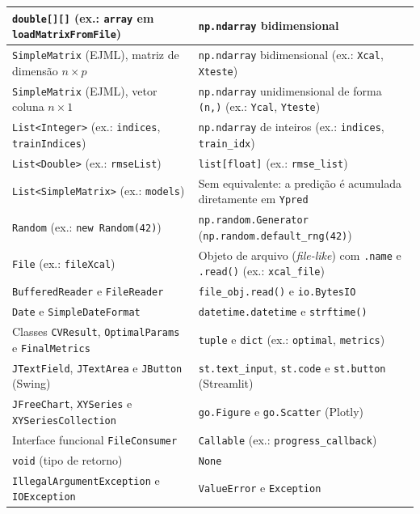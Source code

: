 \begin{quadro}[ht]
\begin{center}
\begin{threeparttable}
\begin{tabularx}{\textwidth}{|>{\raggedright\arraybackslash}X|>{\raggedright\arraybackslash}X|}
\texttt{double[][]} (ex.: \texttt{array} em \texttt{loadMatrixFromFile}) & \texttt{np.ndarray} bidimensional \\ \hline
\texttt{SimpleMatrix} (EJML), matriz de dimensão $n \times p$ & \texttt{np.ndarray} bidimensional (ex.: \texttt{Xcal}, \texttt{Xteste}) \\ \hline
\texttt{SimpleMatrix} (EJML), vetor coluna $n \times 1$ & \texttt{np.ndarray} unidimensional de forma \texttt{(n,)} (ex.: \texttt{Ycal}, \texttt{Yteste}) \\ \hline
\texttt{List<Integer>} (ex.: \texttt{indices}, \texttt{trainIndices}) & \texttt{np.ndarray} de inteiros (ex.: \texttt{indices}, \texttt{train\_idx}) \\ \hline
\texttt{List<Double>} (ex.: \texttt{rmseList}) & \texttt{list[float]} (ex.: \texttt{rmse\_list}) \\ \hline
\texttt{List<SimpleMatrix>} (ex.: \texttt{models}) & Sem equivalente: a predição é acumulada diretamente em \texttt{Ypred} \\ \hline
\texttt{Random} (ex.: \texttt{new Random(42)}) & \texttt{np.random.Generator} (\texttt{np.random.default\_rng(42)}) \\ \hline
\texttt{File} (ex.: \texttt{fileXcal}) & Objeto de arquivo (\textit{file-like}) com \texttt{.name} e \texttt{.read()} (ex.: \texttt{xcal\_file}) \\ \hline
\texttt{BufferedReader} e \texttt{FileReader} & \texttt{file\_obj.read()} e \texttt{io.BytesIO} \\ \hline
\texttt{Date} e \texttt{SimpleDateFormat} & \texttt{datetime.datetime} e \texttt{strftime()} \\ \hline
Classes \texttt{CVResult}, \texttt{OptimalParams} e \texttt{FinalMetrics} & \texttt{tuple} e \texttt{dict} (ex.: \texttt{optimal}, \texttt{metrics}) \\ \hline
\texttt{JTextField}, \texttt{JTextArea} e \texttt{JButton} (Swing) & \texttt{st.text\_input}, \texttt{st.code} e \texttt{st.button} (Streamlit) \\ \hline
\texttt{JFreeChart}, \texttt{XYSeries} e \texttt{XYSeriesCollection} & \texttt{go.Figure} e \texttt{go.Scatter} (Plotly) \\ \hline
Interface funcional \texttt{FileConsumer} & \texttt{Callable} (ex.: \texttt{progress\_callback}) \\ \hline
\texttt{void} (tipo de retorno) & \texttt{None} \\ \hline
\texttt{IllegalArgumentException} e \texttt{IOException} & \texttt{ValueError} e \texttt{Exception} \\ \hline

\end{tabularx}
\end{threeparttable}
\end{center}
\end{quadro}
